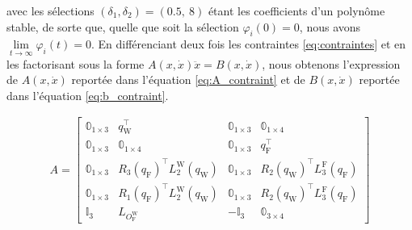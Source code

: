 avec les sélections $(\delta_{1}, \delta_{2}) = (0.5,~8)$ étant les coefficients d'un polynôme stable, de sorte que, quelle que soit la sélection $\varphi_{i}(0) = 0$, nous avons $\lim\limits_{t \to \infty} \varphi_{i}(t) = 0$. En différenciant deux fois les contraintes \eqref{eq:contraintes} et en les factorisant sous la forme $ A(x,\dot{x}) \ddot{x} = B(x,\dot{x})$, nous obtenons l'expression de $A(x,\dot{x})$ reportée dans l'équation \eqref{eq:A_contraint} et de $B(x,\dot{x})$ reportée dans l'équation \eqref{eq:b_contraint}.

\begin{align}
\label{eq:A_contraint}
    A = \begin{bmatrix}
            \mathbb{0}_{1 \times 3} & q_{\text{W}}^\top & \mathbb{0}_{1 \times 3} & \mathbb{0}_{1 \times 4}\\
            \mathbb{0}_{1 \times 3} & \mathbb{0}_{1 \times 4} & \mathbb{0}_{1 \times 3} & q_{\text{F}}^\top\\
            \mathbb{0}_{1 \times 3} & R_{3}(q_{\text{F}})^\top L_{2}^{\text{W}}( q_{\text{W}} ) & \mathbb{0}_{1 \times 3} & R_{2}(q_{\text{W}})^\top L_{3}^{\text{F}}( q_{\text{F}} ) \\
            \mathbb{0}_{1 \times 3} & R_{1}(q_{\text{F}})^\top L_{2}^{\text{W}}( q_{\text{W}} ) & \mathbb{0}_{1 \times 3} & R_{2}(q_{\text{W}})^\top L_{3}^{\text{F}}( q_{\text{F}} ) \\
            \mathbb{I}_{3} & L_{O_{\text{F}}^{\text{W}}} & -\mathbb{I}_{3} & \mathbb{0}_{3 \times 4}
        \end{bmatrix}
\end{align}

